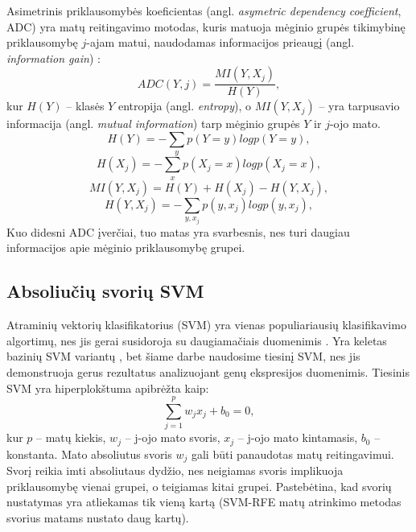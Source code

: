 Asimetrinis priklausomybės koeficientas (angl. \textit{asymetric dependency coefficient}, ADC) yra matų reitingavimo motodas, kuris matuoja mėginio grupės tikimybinę priklausomybę $j$-ajam matui, naudodamas informacijos prieaugį (angl. \textit{information gain}) \cite{kent1983information}:
\begin{equation}
 ADC(Y, j) = \frac{MI(Y, X_j)}{H(Y)},
\end{equation}
kur $H(Y)$ -- klasės $Y$ entropija (angl. \textit{entropy}), o $MI(Y, X_j)$ -- yra tarpusavio informacija \cite{Shannon:2001:MTC:584091.584093} (angl. \textit{mutual information}) tarp mėginio grupės $Y$ ir $j$-ojo mato.
\begin{equation}
 H(Y)=-\sum_y{p(Y=y)log{p(Y=y)}}, 
\end{equation}
\begin{equation}
 H(X_j)=-\sum_x{p(X_j=x) log{p(X_j=x)}},
\end{equation}
\begin{equation}
 MI(Y, X_j) = H(Y) + H(X_j) - H(Y, X_j),
\end{equation}
\begin{equation}
 H(Y, X_j) = -\sum_{y,x_j}{p(y, x_j)log{p(y, x_j)}},
\end{equation}
Kuo didesni ADC įverčiai, tuo matas yra svarbesnis, nes turi daugiau informacijos apie mėginio priklausomybę grupei.

\subsection{Absoliučių svorių SVM}

Atraminių vektorių klasifikatorius (SVM) yra vienas populiariausių klasifikavimo algortimų, nes jis gerai susidoroja su daugiamačiais duomenimis \cite{guyon2002gene}. Yra keletas bazinių SVM variantų \cite{vapnik2000nature}, bet šiame darbe naudosime tiesinį SVM, nes jis demonstruoja gerus rezultatus analizuojant genų ekspresijos duomenimis. Tiesinis SVM yra hiperplokštuma apibrėžta kaip:
\begin{equation}
 \sum_{j=1}^{p}{w_jx_j + b_0 = 0},
\end{equation}
kur $p$ -- matų kiekis, $w_j$ -- j-ojo mato svoris, $x_j$ -- j-ojo mato kintamasis, $b_0$ -- konstanta. Mato absoliutus svoris $w_j$ gali būti panaudotas
matų reitingavimui. Svorį reikia imti absoliutaus dydžio, nes neigiamas svoris implikuoja priklausomybę vienai grupei, o teigiamas kitai grupei. Pastebėtina, kad svorių nustatymas yra atliekamas tik vieną kartą (SVM-RFE matų atrinkimo metodas svorius matams nustato daug kartų).

